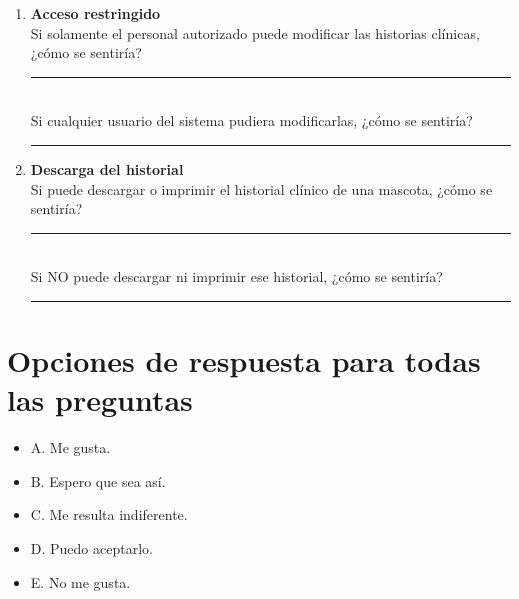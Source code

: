 \documentclass[11pt,a4paper]{article}
\begin{document}
\begin{enumerate}[leftmargin=*, label=\textbf{\arabic*}.]
  \item \textbf{Acceso restringido}\\
  Si solamente el personal autorizado puede modificar las historias clínicas, ¿cómo se sentiría? \rule{1.2cm}{0.4pt}\\
  Si cualquier usuario del sistema pudiera modificarlas, ¿cómo se sentiría? \rule{1.2cm}{0.4pt}

  \item \textbf{Descarga del historial}\\
  Si puede descargar o imprimir el historial clínico de una mascota, ¿cómo se sentiría? \rule{1.2cm}{0.4pt}\\
  Si NO puede descargar ni imprimir ese historial, ¿cómo se sentiría? \rule{1.2cm}{0.4pt}

\end{enumerate}

\section*{Opciones de respuesta para todas las preguntas}

\begin{itemize}[leftmargin=*]
  \item A. Me gusta.
  \item B. Espero que sea así.
  \item C. Me resulta indiferente.
  \item D. Puedo aceptarlo.
  \item E. No me gusta.
\end{itemize}
\end{document}
